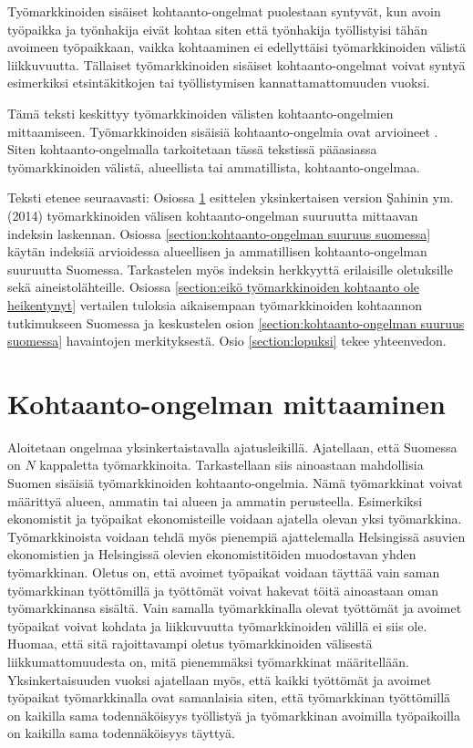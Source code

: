 \documentclass[12pt]{article}
\begin{document}
Työmarkkinoiden sisäiset kohtaanto-ongelmat puolestaan syntyvät, kun avoin työpaikka ja työnhakija eivät kohtaa siten että työnhakija työllistyisi tähän avoimeen työpaikkaan, vaikka kohtaaminen ei edellyttäisi työmarkkinoiden välistä liikkuvuutta. Tällaiset työmarkkinoiden sisäiset kohtaanto-ongelmat voivat syntyä esimerkiksi etsintäkitkojen tai työllistymisen kannattamattomuuden vuoksi. 

Tämä teksti keskittyy työmarkkinoiden välisten kohtaanto-ongelmien mittaamiseen. Työmarkkinoiden sisäisiä kohtaanto-ongelmia ovat arvioineet . Siten kohtaanto-ongelmalla tarkoitetaan tässä tekstissä pääasiassa työmarkkinoiden välistä, alueellista tai ammatillista, kohtaanto-ongelmaa.

Teksti etenee seuraavasti: Osiossa \ref{section:kohtaanto-ongelman mittaaminen} esittelen yksinkertaisen version Şahinin ym. (2014) työmarkkinoiden välisen kohtaanto-ongelman suuruutta mittaavan indeksin laskennan. Osiossa \ref{section:kohtaanto-ongelman suuruus suomessa} käytän indeksiä arvioidessa alueellisen ja ammatillisen kohtaanto-ongelman suuruutta Suomessa. Tarkastelen myös indeksin herkkyyttä erilaisille oletuksille sekä aineistolähteille. Osiossa \ref{section:eikö työmarkkinoiden kohtaanto ole heikentynyt} vertailen tuloksia aikaisempaan työmarkkinoiden kohtaannon tutkimukseen Suomessa ja keskustelen osion \ref{section:kohtaanto-ongelman suuruus suomessa} havaintojen merkityksestä. Osio \ref{section:lopuksi} tekee yhteenvedon.

\section{Kohtaanto-ongelman mittaaminen} \label{section:kohtaanto-ongelman mittaaminen}

Aloitetaan ongelmaa yksinkertaistavalla ajatusleikillä. Ajatellaan, että Suomessa on $N$ kappaletta työmarkkinoita. Tarkastellaan siis ainoastaan mahdollisia Suomen sisäisiä työmarkkinoiden kohtaanto-ongelmia. Nämä työmarkkinat voivat määrittyä alueen, ammatin tai alueen ja ammatin perusteella. Esimerkiksi ekonomistit ja työpaikat ekonomisteille voidaan ajatella olevan yksi työmarkkina. Työmarkkinoista voidaan tehdä myös pienempiä ajattelemalla Helsingissä asuvien ekonomistien ja Helsingissä olevien ekonomistitöiden muodostavan yhden työmarkkinan. Oletus on, että avoimet työpaikat voidaan täyttää vain saman työmarkkinan työttömillä ja työttömät voivat hakevat töitä ainoastaan oman työmarkkinansa sisältä. Vain samalla työmarkkinalla olevat työttömät ja avoimet työpaikat voivat kohdata ja liikkuvuutta työmarkkinoiden välillä ei siis ole. Huomaa, että sitä rajoittavampi oletus työmarkkinoiden välisestä liikkumattomuudesta on, mitä pienemmäksi työmarkkinat määritellään. Yksinkertaisuuden vuoksi ajatellaan myös, että kaikki työttömät ja avoimet työpaikat työmarkkinalla ovat samanlaisia siten, että työmarkkinan työttömillä on kaikilla sama todennäköisyys työllistyä ja työmarkkinan avoimilla työpaikoilla on kaikilla sama todennäköisyys täyttyä.
\end{document}
